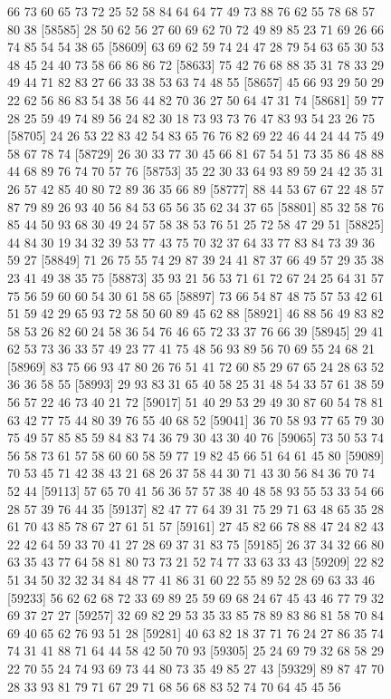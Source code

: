 \documentclass{article}
\begin{document}
\begin{figure}[H]
\begin{Schunk}
\begin{Soutput}
[58561] 66 73 60 65 73 72 25 52 58 84 64 64 77 49 73 88 76 62 55 78 68 57 80 38
[58585] 28 50 62 56 27 60 69 62 70 72 49 89 85 23 71 69 26 66 74 85 54 54 38 65
[58609] 63 69 62 59 74 24 47 28 79 54 63 65 30 53 48 45 24 40 73 58 66 86 86 72
[58633] 75 42 76 68 88 35 31 78 33 29 49 44 71 82 83 27 66 33 38 53 63 74 48 55
[58657] 45 66 93 29 50 29 22 62 56 86 83 54 38 56 44 82 70 36 27 50 64 47 31 74
[58681] 59 77 28 25 59 49 74 89 56 24 82 30 18 73 93 73 76 47 83 93 54 23 26 75
[58705] 24 26 53 22 83 42 54 83 65 76 76 82 69 22 46 44 24 44 75 49 58 67 78 74
[58729] 26 30 33 77 30 45 66 81 67 54 51 73 35 86 48 88 44 68 89 76 74 70 57 76
[58753] 35 22 30 33 64 93 89 59 24 42 35 31 26 57 42 85 40 80 72 89 36 35 66 89
[58777] 88 44 53 67 67 22 48 57 87 79 89 26 93 40 56 84 53 65 56 35 62 34 37 65
[58801] 85 32 58 76 85 44 50 93 68 30 49 24 57 58 38 53 76 51 25 72 58 47 29 51
[58825] 44 84 30 19 34 32 39 53 77 43 75 70 32 37 64 33 77 83 84 73 39 36 59 27
[58849] 71 26 75 55 74 29 87 39 24 41 87 37 66 49 57 29 35 38 23 41 49 38 35 75
[58873] 35 93 21 56 53 71 61 72 67 24 25 64 31 57 75 56 59 60 60 54 30 61 58 65
[58897] 73 66 54 87 48 75 57 53 42 61 51 59 42 29 65 93 72 58 50 60 89 45 62 88
[58921] 46 88 56 49 83 82 58 53 26 82 60 24 58 36 54 76 46 65 72 33 37 76 66 39
[58945] 29 41 62 53 73 36 33 57 49 23 77 41 75 48 56 93 89 56 70 69 55 24 68 21
[58969] 83 75 66 93 47 80 26 76 51 41 72 60 85 29 67 65 24 28 63 52 36 36 58 55
[58993] 29 93 83 31 65 40 58 25 31 48 54 33 57 61 38 59 56 57 22 46 73 40 21 72
[59017] 51 40 29 53 29 49 30 87 60 54 78 81 63 42 77 75 44 80 39 76 55 40 68 52
[59041] 36 70 58 93 77 65 79 30 75 49 57 85 85 59 84 83 74 36 79 30 43 30 40 76
[59065] 73 50 53 74 56 58 73 61 57 58 60 60 58 59 77 19 82 45 66 51 64 61 45 80
[59089] 70 53 45 71 42 38 43 21 68 26 37 58 44 30 71 43 30 56 84 36 70 74 52 44
[59113] 57 65 70 41 56 36 57 57 38 40 48 58 93 55 53 33 54 66 28 57 39 76 44 35
[59137] 82 47 77 64 39 31 75 29 71 63 48 65 35 28 61 70 43 85 78 67 27 61 51 57
[59161] 27 45 82 66 78 88 47 24 82 43 22 42 64 59 33 70 41 27 28 69 37 31 83 75
[59185] 26 37 34 32 66 80 63 35 43 77 64 58 81 80 73 73 21 52 74 77 33 63 33 43
[59209] 22 82 51 34 50 32 32 34 84 48 77 41 86 31 60 22 55 89 52 28 69 63 33 46
[59233] 56 62 62 68 72 33 69 89 25 59 69 68 24 67 45 43 46 77 79 32 69 37 27 27
[59257] 32 69 82 29 53 35 33 85 78 89 83 86 81 58 70 84 69 40 65 62 76 93 51 28
[59281] 40 63 82 18 37 71 76 24 27 86 35 74 74 31 41 88 71 64 44 58 42 50 70 93
[59305] 25 24 69 79 32 68 58 29 22 70 55 24 74 93 69 73 44 80 73 35 49 85 27 43
[59329] 89 87 47 70 28 33 93 81 79 71 67 29 71 68 56 68 83 52 74 70 64 45 45 56

\end{Soutput}
\end{Schunk}
\end{figure}
\end{document}
